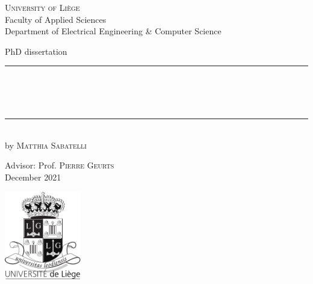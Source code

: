 
\begin{titlepage}
	\begin{addmargin}[-1cm]{-3cm}
    \begin{center}
        \large
        {\Large \textsc{University of Li{\`e}ge}}\\[1ex]
        Faculty of Applied Sciences\\
        Department of Electrical Engineering \& Computer Science\\

        \vfill

        PhD dissertation\\ \vskip1cm
        \rule{14cm}{0.4pt}\\ \bigskip
        \begingroup
            \Large
            \color{Maroon}\spacedallcaps{\myTitle} \\ \bigskip
        \endgroup
        \spacedlowsmallcaps{\mySubtitle} \\ \bigskip
        \rule{14cm}{0.4pt}\\ \vskip1cm
        by \textsc{Matthia Sabatelli}

        \vfill
        \vfill
        \vfill

        \hfill Advisor: Prof. \textsc{Pierre Geurts}\\
        \hfill December 2021
    \end{center}
    \vspace{-3.5cm}\includegraphics[width=0.25\textwidth]{Images/blason.pdf}
  \end{addmargin}
\end{titlepage}
